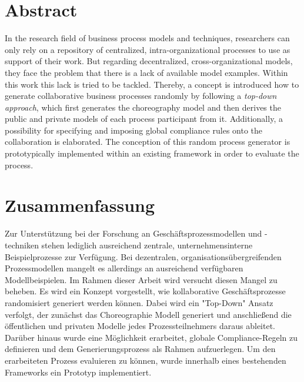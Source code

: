 \section{Abstract}

In the research field of business process models and techniques, researchers can only rely on a repository of centralized, intra-organizational processes to use as support of their work. But regarding decentralized, cross-organizational models, they face the problem that there is a lack of available model examples. Within this work this lack is tried to be tackled. Thereby, a concept is introduced how to generate collaborative business processes randomly by following a \textit{top-down approach}, which first generates the choreography model and then derives the public and private models of each process participant from it. Additionally, a possibility for specifying and imposing global compliance rules onto the collaboration is elaborated. The conception of this random process generator is prototypically implemented within an existing framework in order to evaluate the process.

\section{Zusammenfassung}

Zur Unterstützung bei der Forschung an Geschäftsprozessmodellen und -techniken stehen lediglich ausreichend zentrale, unternehmensinterne Beispielprozesse zur Verfügung. Bei dezentralen, organisationsübergreifenden Prozessmodellen mangelt es allerdings an ausreichend verfügbaren Modellbeispielen. Im Rahmen dieser Arbeit wird versucht diesen Mangel zu beheben. Es wird ein Konzept vorgestellt, wie kollaborative Geschäftsprozesse randomisiert generiert werden können. Dabei wird ein "Top-Down" Ansatz verfolgt, der zunächst das Choreographie Modell generiert und anschließend die öffentlichen und privaten Modelle jedes Prozessteilnehmers daraus ableitet. Darüber hinaus wurde eine Möglichkeit erarbeitet, globale Compliance-Regeln zu definieren und dem Generierungsprozess als Rahmen aufzuerlegen. Um den erarbeiteten Prozess evaluieren zu können, wurde innerhalb eines bestehenden Frameworks ein Prototyp implementiert.

